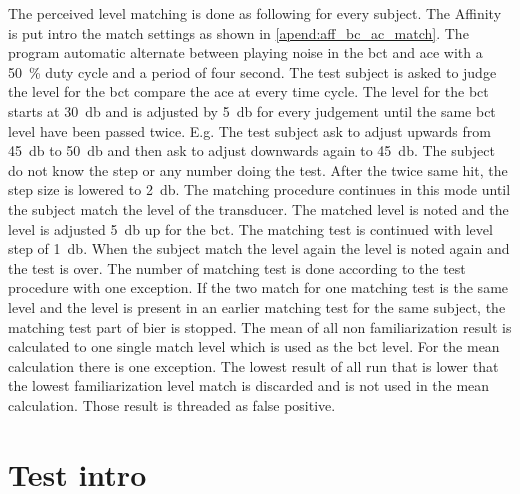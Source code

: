 The perceived level matching is done as following for every subject. The Affinity is put intro the match settings as shown in \autoref{apend:aff_bc_ac_match}. The program automatic alternate between playing noise in the \gls{bct} and \gls{ace} with a \SI{50}{\percent} duty cycle and a period of four second. The test subject is asked to judge the level for the \gls{bct} compare the \gls{ace} at every time cycle. The level for the \gls{bct} starts at \SI{30}{\decibel} and is adjusted by \SI{5}{\decibel} for every judgement until the same \gls{bct} level have been passed twice. E.g. The test subject ask to adjust upwards from \SI{45}{\decibel} to \SI{50}{\decibel} and then ask to adjust downwards again to \SI{45}{\decibel}. The subject do not know the step or any number doing the test. After the twice same hit, the step size is lowered to \SI{2}{\decibel}. The matching procedure continues in this mode until the subject match the level of the transducer. The matched level is noted and the level is adjusted \SI{5}{\decibel} up for the \gls{bct}. The matching test is continued with level step of \SI{1}{\decibel}. When the subject match the level again the level is noted again and the test is over. The number of matching test is done according to the test procedure with one exception. If the two match for one matching test is the same level and the level is present in an earlier matching test for the same subject, the matching test part of \gls{bier} is stopped. The mean of all non familiarization result is calculated to one single match level which is used as the \gls{bct} level. For the mean calculation there is one exception. The lowest result of all run that is lower that the lowest familiarization level match is discarded and is not used in the mean calculation. Those result is threaded as false positive.









\section{Test intro}


